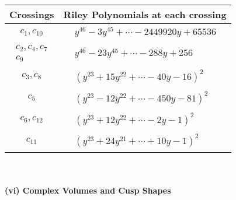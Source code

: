 \documentclass[1p]{elsarticle_modified}
\theoremstyle{definition}
\begin{document}
\begin{tabular}{m{50pt}|m{274pt}}
Crossings & \hspace{64pt}Riley Polynomials at each crossing \\
\hline $$\begin{aligned}c_{1},c_{10}\end{aligned}$$&$\begin{aligned}
&y^{46}-3 y^{45}+\cdots-2449920 y+65536
\end{aligned}$\\
\hline $$\begin{aligned}c_{2},c_{4},c_{7}\\c_{9}\end{aligned}$$&$\begin{aligned}
&y^{46}-23 y^{45}+\cdots-288 y+256
\end{aligned}$\\
\hline $$\begin{aligned}c_{3},c_{8}\end{aligned}$$&$\begin{aligned}
&(y^{23}+15 y^{22}+\cdots-40 y-16)^{2}
\end{aligned}$\\
\hline $$\begin{aligned}c_{5}\end{aligned}$$&$\begin{aligned}
&(y^{23}-12 y^{22}+\cdots-450 y-81)^{2}
\end{aligned}$\\
\hline $$\begin{aligned}c_{6},c_{12}\end{aligned}$$&$\begin{aligned}
&(y^{23}+12 y^{22}+\cdots-2 y-1)^{2}
\end{aligned}$\\
\hline $$\begin{aligned}c_{11}\end{aligned}$$&$\begin{aligned}
&(y^{23}+24 y^{21}+\cdots+10 y-1)^{2}
\end{aligned}$\\
\hline
\end{tabular}\\~\\
\newpage\flushleft \textbf{(vi) Complex Volumes and Cusp Shapes}
\end{document}
